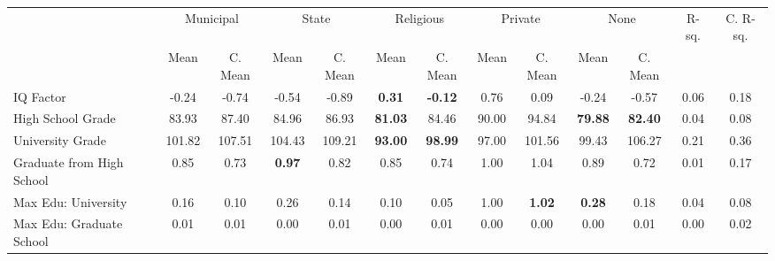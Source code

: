 \begin{tabular}{l c c c c c c c c c c c c}
\toprule
& \multicolumn{2}{c}{Municipal} & \multicolumn{2}{c}{State} & \multicolumn{2}{c}{Religious} & \multicolumn{2}{c}{Private} & \multicolumn{2}{c}{None} & R-sq. & C. R-sq. \\
& \scriptsize Mean & \scriptsize C. Mean & \scriptsize Mean & \scriptsize C. Mean & \scriptsize Mean & \scriptsize C. Mean & \scriptsize Mean & \scriptsize C. Mean & \scriptsize Mean & \scriptsize C. Mean & & \\
\midrule
IQ Factor &     -0.24 & -0.74 &     -0.54 & -0.89 & \textbf{     0.31} & \textbf{    -0.12} &      0.76 & 0.09 &     -0.24 & -0.57 &      0.06 &      0.18 \\
High School Grade &     83.93 & 87.40 &     84.96 & 86.93 & \textbf{    81.03} & 84.46 &     90.00 & 94.84 & \textbf{    79.88} & \textbf{    82.40} &      0.04 &      0.08 \\
University Grade &    101.82 & 107.51 &    104.43 & 109.21 & \textbf{    93.00} & \textbf{    98.99} &     97.00 & 101.56 &     99.43 & 106.27 &      0.21 &      0.36 \\
Graduate from High School &      0.85 & 0.73 & \textbf{     0.97} & 0.82 &      0.85 & 0.74 &      1.00 & 1.04 &      0.89 & 0.72 &      0.01 &      0.17 \\
Max Edu: University &      0.16 & 0.10 &      0.26 & 0.14 &      0.10 & 0.05 &      1.00 & \textbf{     1.02} & \textbf{     0.28} & 0.18 &      0.04 &      0.08 \\
Max Edu: Graduate School &      0.01 & 0.01 &      0.00 & 0.01 &      0.00 & 0.01 &      0.00 & 0.00 &      0.00 & 0.01 &      0.00 &      0.02 \\
\bottomrule
\end{tabular}
